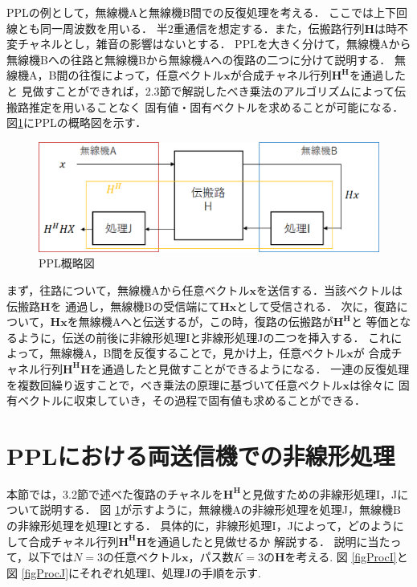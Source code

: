 PPLの例として，無線機Aと無線機B間での反復処理を考える．
ここでは上下回線とも同一周波数を用いる．
半2重通信を想定する．また，伝搬路行列$\bm{H}$は時不変チャネルとし，雑音の影響はないとする．
PPLを大きく分けて，無線機Aから無線機Bへの往路と無線機Bから無線機Aへの復路の二つに分けて説明する．
無線機A，B間の往復によって，任意ベクトル$\bm{x}$が合成チャネル行列$\bm{H^H}$を通過したと
見做すことができれば，2.3節で解説したべき乗法のアルゴリズムによって伝搬路推定を用いることなく
固有値・固有ベクトルを求めることが可能になる．
図\ref{figPPL}にPPLの概略図を示す．

\begin{figure}
    \centering
    \includegraphics[width=\linewidth]{chapter3/figure/PPL.eps}
    \caption{PPL概略図}
    \label{figPPL}
\end{figure}

まず，往路について，無線機Aから任意ベクトル$\bm{x}$を送信する．当該ベクトルは伝搬路$\bm{H}$を
通過し，無線機Bの受信端にて$\bm{Hx}$として受信される．
次に，復路について，$\bm{Hx}$を無線機Aへと伝送するが，この時，復路の伝搬路が$\bm{H^H}$と
等価となるように，伝送の前後に非線形処理Iと非線形処理Jの二つを挿入する．
これによって，無線機A，B間を反復することで，見かけ上，任意ベクトル$\bm{x}$が
合成チャネル行列$\bm{H^HH}$を通過したと見做すことができるようになる．
一連の反復処理を複数回繰り返すことで，べき乗法の原理に基づいて任意ベクトル$\bm{x}$は徐々に
固有ベクトルに収束していき，その過程で固有値も求めることができる．

\section{PPLにおける両送信機での非線形処理}
本節では，3.2節で述べた復路のチャネルを$\bm{H^H}$と見做すための非線形処理I，Jについて説明する．
図 \ref{figPPL}が示すように，無線機Aの非線形処理を処理J，無線機Bの非線形処理を処理Iとする．
具体的に，非線形処理I，Jによって，どのようにして合成チャネル行列$\bm{H^HH}$を通過したと見做せるか
解説する．
説明に当たって，以下では$N=3$の任意ベクトル$\bm{x}$，パス数$K=3$の$\bm{H}$を考える.
図 \ref{figProcI}と図 \ref{figProcJ}にそれぞれ処理I、処理Jの手順を示す.

